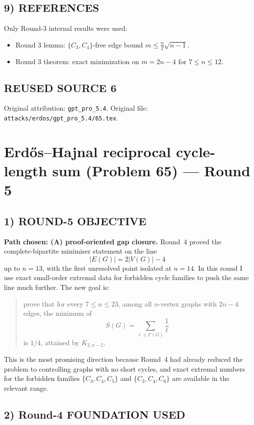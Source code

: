 \subsection*{9) REFERENCES}
Only Round-3 internal results were used:
\begin{itemize}
\item Round 3 lemma: $\{C_3,C_4\}$-free edge bound $m\le \frac n2\sqrt{n-1}$.
\item Round 3 theorem: exact minimization on $m=2n-4$ for $7\le n\le 12$.
\end{itemize}


\subsection*{REUSED SOURCE 6}
Original attribution: \texttt{gpt\_pro\_5.4}.
Original file: \texttt{attacks/erdos/gpt\_pro\_5.4/65.tex}.

\section{Erd\H{o}s--Hajnal reciprocal cycle-length sum (Problem 65) --- Round 5}

\subsection*{1) ROUND-5 OBJECTIVE}

\textbf{Path chosen: (A) proof-oriented gap closure.}
Round~4 proved the complete-bipartite minimiser statement on the line
\[
|E(G)|=2|V(G)|-4
\]
up to $n=13$, with the first unresolved point isolated at $n=14$.
In this round I use exact small-order extremal data for forbidden cycle families to push the same line much further.
The new goal is:
\begin{quote}
prove that for every $7\le n\le 23$, among all $n$-vertex graphs with $2n-4$ edges, the minimum of
\[
S(G)=\sum_{\ell\in\mathcal C(G)}\frac1\ell
\]
is $1/4$, attained by $K_{2,n-2}$.
\end{quote}
This is the most promising direction because Round~4 had already reduced the problem to controlling graphs with no short cycles, and exact extremal numbers for the forbidden families $\{C_3,C_4,C_5\}$ and $\{C_3,C_4,C_6\}$ are available in the relevant range.

\subsection*{2) Round-4 FOUNDATION USED}

